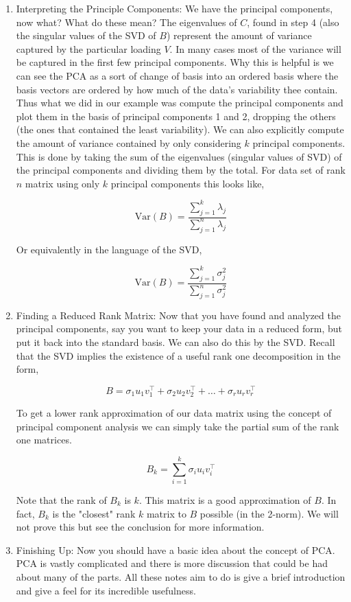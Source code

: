 \documentclass{article}
\begin{document}
\begin{enumerate}
\item Interpreting the Principle Components: We have the principal components, now what? What do these mean? The eigenvalues of $C$, found in step 4 (also the singular values of the SVD of $B$) represent the amount of variance captured by the particular loading $V$. In many cases most of the variance will be captured in the first few principal components. Why this is helpful is we can see the PCA as a sort of change of basis into an ordered basis where the basis vectors are ordered by how much of the data's variability thee contain. Thus what we did in our example was compute the principal components and plot them in the basis of principal components 1 and 2, dropping the others (the ones that contained the least variability). We can also explicitly compute the amount of variance contained by only considering $k$ principal components. This is done by taking the sum of the eigenvalues (singular values of SVD) of the principal components and dividing them by the total. For data set of rank $n$ matrix using only $k$ principal components this looks like,


$$\text{Var}(B)=\frac{\sum_{j=1}^{k}\lambda_j}{\sum_{j=1}^{n}\lambda_j}$$

Or equivalently in the language of the SVD,

$$\text{Var}(B)=\frac{\sum_{j=1}^{k}\sigma^2_j}{\sum_{j=1}^{n}\sigma^2_j}$$

\item Finding a Reduced Rank Matrix: Now that you have found and analyzed the principal components, say you want to keep your data in a reduced form, but put it back into the standard basis. We can also do this by the SVD. Recall that the SVD implies the existence of a useful rank one decomposition in the form,

$$B=\sigma_1u_1v^\top_1+\sigma_2u_2v^\top_2+\dots+\sigma_ru_rv^\top_r$$

To get a lower rank approximation of our data matrix using the concept of principal component analysis we can simply take the partial sum of the rank one matrices.

$$B_k=\sum_{i=1}^k\sigma_iu_iv^\top_i$$

Note that the rank of $B_k$ is $k$. This matrix is a good approximation of $B$. In fact, $B_k$ is the "closest" rank $k$ matrix to $B$ possible (in the 2-norm). We will not prove this but see the conclusion for more information.

\item Finishing Up: Now you should have a basic idea about the concept of PCA. PCA is vastly complicated and there is more discussion that could be had about many of the parts. All these notes aim to do is give a brief introduction and give a feel for its incredible usefulness. 
\end{enumerate}
\end{document}
